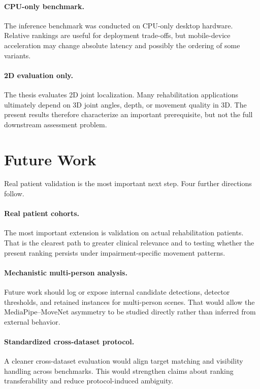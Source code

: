 \paragraph{CPU-only benchmark.}
The inference benchmark was conducted on CPU-only desktop hardware. Relative rankings are useful for deployment trade-offs, but mobile-device acceleration may change absolute latency and possibly the ordering of some variants.

\paragraph{2D evaluation only.}
The thesis evaluates 2D joint localization. Many rehabilitation applications ultimately depend on 3D joint angles, depth, or movement quality in 3D. The present results therefore characterize an important prerequisite, but not the full downstream assessment problem.


\section{Future Work}
\label{sec:future-work}

Real patient validation is the most important next step. Four further directions follow.

\paragraph{Real patient cohorts.}
The most important extension is validation on actual rehabilitation patients. That is the clearest path to greater clinical relevance and to testing whether the present ranking persists under impairment-specific movement patterns.

\paragraph{Mechanistic multi-person analysis.}
Future work should log or expose internal candidate detections, detector thresholds, and retained instances for multi-person scenes. That would allow the MediaPipe--MoveNet asymmetry to be studied directly rather than inferred from external behavior.

\paragraph{Standardized cross-dataset protocol.}
A cleaner cross-dataset evaluation would align target matching and visibility handling across benchmarks. This would strengthen claims about ranking transferability and reduce protocol-induced ambiguity.

